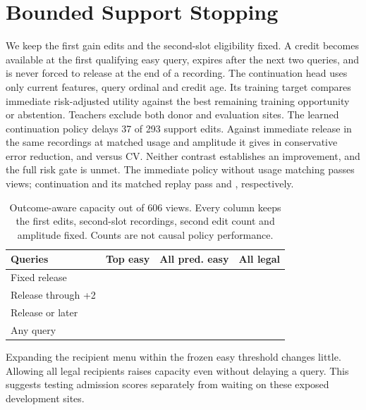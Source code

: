 \section{Bounded Support Stopping}

We keep the first gain edits and the second-slot eligibility
fixed. A credit becomes available at the first qualifying easy
query, expires after the next two queries, and is never forced
to release at the end of a recording. The continuation head uses
only current features, query ordinal and credit age. Its
training target compares immediate risk-adjusted utility
against the best remaining training opportunity or abstention.
Teachers exclude both donor and evaluation sites.
The learned continuation policy delays 37 of 293 support
edits. Against immediate release in the same recordings at
matched usage and amplitude it gives \StopSupportMatched{} in
conservative error reduction, and \StopSupportCV{} versus CV.
Neither contrast establishes an improvement, and the full risk
gate is unmet. The immediate policy without usage matching
passes \StopSupportImmediateJoint{} views; continuation and its
matched replay pass \StopSupportContinueJoint{} and
\StopSupportReplayJoint{}, respectively.

\begin{table}[h]
\centering
\caption{Outcome-aware capacity out of 606 views. Every column
keeps the first edits, second-slot recordings, second edit count
and amplitude fixed. Counts are not causal policy performance.}
\small
\begin{tabular}{lrrr}
\toprule
Queries & Top easy & All pred. easy & All legal \\
\midrule
Fixed release & \StopSupportFixedTop{} & \StopSupportFixedEasy{} & \StopSupportFixedLegal{} \\
Release through +2 & \StopSupportTwoTop{} & \StopSupportTwoEasy{} & \StopSupportTwoLegal{} \\
Release or later & \StopSupportLaterTop{} & \StopSupportLaterEasy{} & \StopSupportLaterLegal{} \\
Any query & \StopSupportAnyTop{} & \StopSupportAnyEasy{} & \StopSupportAnyLegal{} \\
\bottomrule
\end{tabular}
\end{table}

Expanding the recipient menu within the frozen easy threshold
changes little. Allowing all legal recipients raises capacity
even without delaying a query. This suggests testing admission
scores separately from waiting on these exposed development sites.
